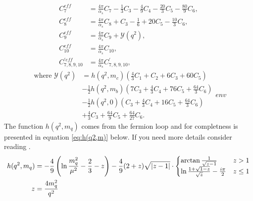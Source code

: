 \documentclass[english]{uzhpub}
\begin{document}
 \begin{equation}
  \begin{split}
   C_7^{eff} &= \frac{4 \pi}{\alpha_s} C_7 - \frac{1}{3} C_3 - \frac{4}{9} C_4 - \frac{20}{3} C_5 - \frac{80}{9} C_6, \\
   C_8^{eff} &= \frac{4 \pi}{\alpha_s} C_8 + C_3 - \frac{1}{6} + 20 C_5 - \frac{10}{3} C_6 , \\
   C_9^{eff} &= \frac{4\pi}{\alpha_s} C_9 + \mathcal{Y}(q^2), \\
   C_{10}^{eff} &= \frac{4 \pi}{\alpha_s} C_{10}, \\
   C_{7,8,9,10}^{\prime eff} &= \frac{4 \pi}{\alpha_s} C_{7,8,9,10}^{\prime},
  \end{split}
 \end{equation}
 \begin{equation}
  \begin{split}
   \text{where   } \mathcal{Y} (q^2) &= h(q^2,m_c) \left( \frac{4}{3}C_1 + C_2 + 6C_3 + 60C_5 \right) \\
   &- \frac{1}{2} h(q^2,m_b) \left(7C_3 + \frac{4}{3}C_4 + 76C_5 + \frac{64}{3} C_6  \right) \\
   &- \frac{1}{2} h(q^2,0) \left( C_3 + \frac{4}{3}C_4 + 16C_5 + \frac{64}{3} C_6 \right) \\
   &+ \frac{4}{3} C_3 + \frac{64}{9} C_5 + \frac{64}{27} C_6 .
  \end{split}env
 \end{equation}
 The function $h(q^2,m_q)$ comes from the fermion loop and for completness is presented in equation \ref{eq:h(q2,m)} below. If you need more details consider reading \cite{bib:Wilson}.
 \begin{align}
  h(q^2,m_q)                                            & = - \frac{4}{9} \left(\ln{\frac{m_q^2}{\mu^2}} - \frac{2}{3} - z \right) - \frac{4}{9}(2+z) \sqrt{|z-1|}  \cdot  \begin{cases}
  \arctan{\frac{1}{\sqrt{z-1}}}                         & z > 1                                                                                                                          \\
  \ln{\frac{1+ \sqrt{1-z}}{\sqrt{z}}} - \frac{i \pi}{2} & z \leq 1
  \end{cases}
  \label{eq:h(q2,m)} \\
  \notag z                                              & = \frac{4m_q^2}{q^2}
 \end{align}
\end{document}
